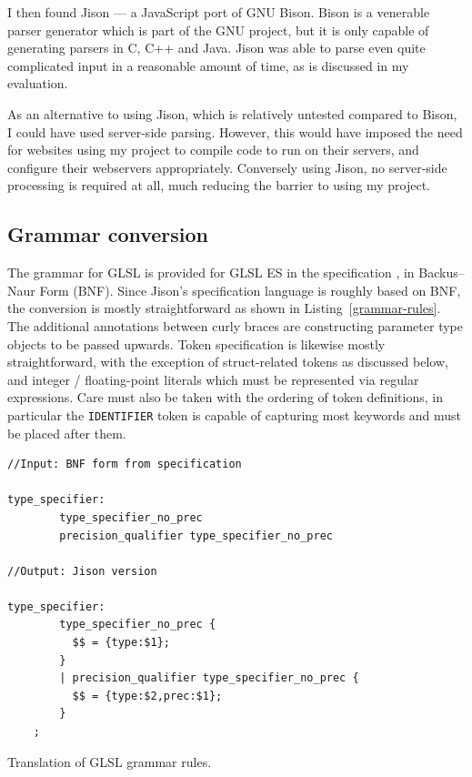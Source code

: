 \documentclass[12pt,twoside,notitlepage]{report}
\begin{document}
I then found Jison \citep{jison} --- a JavaScript port of GNU Bison. Bison is a venerable parser generator which is part of the GNU project, but it is only capable of generating parsers in C, C++ and Java.  Jison was able to parse even quite complicated input in a reasonable amount of time, as is discussed in my evaluation. 

As an alternative to using Jison, which is relatively untested compared to Bison, I could have used server-side parsing. However, this would have imposed the need for websites using my project to compile code to run on their servers, and configure their webservers appropriately. Conversely using Jison, no server-side processing is required at all, much reducing the barrier to using my project.

\subsection{Grammar conversion}
The grammar for GLSL is provided for GLSL ES in the specification \citep{glsl-spec}, in Backus–Naur Form (BNF). Since Jison's specification language is roughly based on BNF, the conversion is mostly straightforward as shown in Listing~\ref{grammar-rules}. The additional annotations between curly braces are constructing parameter type objects to be passed upwards. Token specification is likewise mostly straightforward, with the exception of struct-related tokens as discussed below, and integer / floating-point literals which must be represented via regular expressions. Care must also be taken with the ordering of token definitions, in particular the \texttt{IDENTIFIER} token is capable of capturing most keywords and must be placed after them.
\begin{listing}
\begin{verbatim}
//Input: BNF form from specification

type_specifier:
        type_specifier_no_prec
        precision_qualifier type_specifier_no_prec

//Output: Jison version

type_specifier:
        type_specifier_no_prec { 
          $$ = {type:$1}; 
        }
        | precision_qualifier type_specifier_no_prec { 
          $$ = {type:$2,prec:$1}; 
        }
	;
\end{verbatim}
\caption{Translation of GLSL grammar rules.\label{grammar-rules}}
\end{listing}
\end{document}
